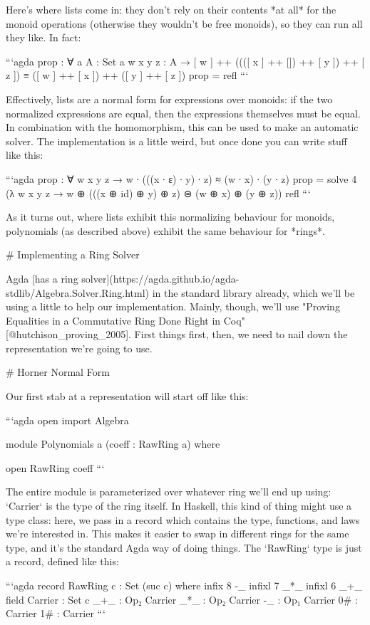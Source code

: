 \documentclass{article}
\begin{document}
Here's where lists come in: they don't rely on their contents *at all* for the
monoid operations (otherwise they wouldn't be free monoids), so they can run all
they like. In fact:


```agda
prop : ∀ {a} {A : Set a} {w x y z : A}
     →  [ w ] ++ ((([ x ] ++ []) ++ [ y ]) ++ [ z ])
     ≡ ([ w ] ++ [ x ]) ++ ([ y ] ++ [ z ])
prop = refl
```

Effectively, lists are a normal form for expressions over monoids: if the two
normalized expressions are equal, then the expressions themselves must be equal.
In combination with the homomorphism, this can be used to make an automatic
solver. The implementation is a little weird, but once done you can write stuff
like this:

```agda
prop : ∀ w x y z → w ∙ (((x ∙ ε) ∙ y) ∙ z) ≈ (w ∙ x) ∙ (y ∙ z)
prop = solve 4
  (λ w x y z →  w ⊕ (((x ⊕ id) ⊕ y) ⊕ z) ⊜ (w ⊕ x) ⊕ (y ⊕ z))
  refl
```

As it turns out, where lists exhibit this normalizing behaviour for monoids,
polynomials (as described above) exhibit the same behaviour for *rings*.

# Implementing a Ring Solver

Agda [has a ring
solver](https://agda.github.io/agda-stdlib/Algebra.Solver.Ring.html) in the
standard library already, which we'll be using a little to help our
implementation. Mainly, though, we'll use "Proving Equalities in a Commutative
Ring Done Right in Coq" [@hutchison_proving_2005]. First things first, then, we
need to nail down the representation we're going to use.

# Horner Normal Form

Our first stab at a representation will start off like this:

```agda
open import Algebra

module Polynomials {a} (coeff : RawRing a) where

open RawRing coeff
```

The entire module is parameterized over whatever ring we'll end up using:
`Carrier` is the type of the ring itself. In Haskell, this kind of thing might
use a type class: here, we pass in a record which contains the type, functions,
and laws we're interested in. This makes it easier to swap in different rings
for the same type, and it's the standard Agda way of doing things. The `RawRing`
type is just a record, defined like this:

```agda
record RawRing c : Set (suc c) where
  infix  8 -_
  infixl 7 _*_
  infixl 6 _+_
  field
    Carrier : Set c
    _+_     : Op₂ Carrier
    _*_     : Op₂ Carrier
    -_      : Op₁ Carrier
    0#      : Carrier
    1#      : Carrier
```
\end{document}
